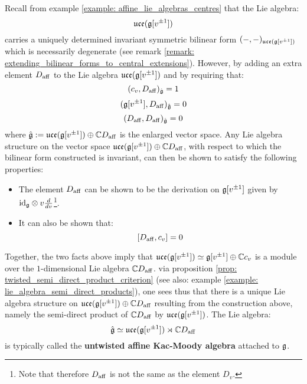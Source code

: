         Recall from example \ref{example: affine_lie_algebras_centres} that the Lie algebra:
            $$\mathfrak{uce}(\mathfrak{g}[v^{\pm 1}])$$
        carries a uniquely determined invariant symmetric bilinear form $(-, -)_{\mathfrak{uce}(\mathfrak{g}[v^{\pm 1}])}$ which is necessarily degenerate (see remark \ref{remark: extending_bilinear_forms_to_central_extensions}). However, by adding an extra element $D_{\mathrm{aff}}$ to the Lie algebra $\mathfrak{uce}(\mathfrak{g}[v^{\pm 1}])$ and by requiring that:
            $$(c_v, D_{\mathrm{aff}})_{\hat{\mathfrak{g}}} = 1$$
            $$(\mathfrak{g}[v^{\pm 1}], D_{\mathrm{aff}})_{\hat{\mathfrak{g}}} = 0$$
            $$(D_{\mathrm{aff}}, D_{\mathrm{aff}})_{\hat{\mathfrak{g}}} = 0$$
        where $\hat{\mathfrak{g}} := \mathfrak{uce}(\mathfrak{g}[v^{\pm 1}]) \oplus \mathbb{C} D_{\mathrm{aff}}$ is the enlarged vector space. Any Lie algebra structure on the vector space $\mathfrak{uce}(\mathfrak{g}[v^{\pm 1}]) \oplus \mathbb{C} D_{\mathrm{aff}}$, with respect to which the bilinear form constructed is invariant, can then be shown to satisfy the following properties:
        \begin{itemize}
            \item The element $D_{\mathrm{aff}}$ can be shown to be the derivation on $\mathfrak{g}[v^{\pm 1}]$ given by $\id_{\g} \tensor v \frac{d}{dv}$\footnote{Note that therefore $D_{\mathrm{aff}}$ is not the same as the element $D_v$.}.
            \item It can also be shown that:
                $$[D_{\mathrm{aff}}, c_v] = 0$$
        \end{itemize}
        Together, the two facts above imply that $\mathfrak{uce}(\mathfrak{g}[v^{\pm 1}]) \simeq \mathfrak{g}[v^{\pm 1}] \oplus \mathbb{C} c_v$ is a module over the $1$-dimensional Lie algebra $\mathbb{C} D_{\mathrm{aff}}$. via proposition \ref{prop: twisted_semi_direct_product_criterion} (see also: example \ref{example: lie_algebra_semi_direct_products}), one sees thus that there is a unique Lie algebra structure on $\mathfrak{uce}(\mathfrak{g}[v^{\pm 1}]) \oplus \mathbb{C} D_{\mathrm{aff}}$ resulting from the construction above, namely the semi-direct product of $\mathbb{C} D_{\mathrm{aff}}$ by $\mathfrak{uce}(\mathfrak{g}[v^{\pm 1}])$. The Lie algebra:
            $$\hat{\mathfrak{g}} \simeq \mathfrak{uce}(\mathfrak{g}[v^{\pm 1}]) \rtimes \mathbb{C} D_{\mathrm{aff}}$$
        is typically called the \textbf{untwisted affine Kac-Moody algebra} attached to $\mathfrak{g}$.

